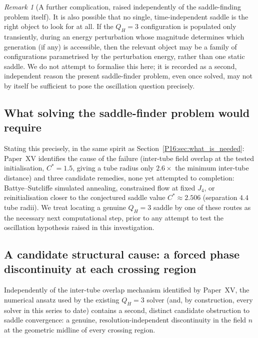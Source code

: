 \documentclass[11pt,a4paper]{article}
\theoremstyle{definition}\newtheorem{definition}[theorem]{Definition}
\theoremstyle{remark}
\newtheorem{remark}[theorem]{Remark}
\theoremstyle{definition}\newtheorem{construction}[theorem]{Construction}
\newcommand{\QH}{Q_H}
\begin{document}
\begin{remark}[A further complication, raised independently of the
  saddle-finding problem itself]
\label{P16:rem:transient_complication}
It is also possible that no single, time-independent saddle is the
right object to look for at all. If the $\QH=3$ configuration is
populated only transiently, during an energy perturbation whose
magnitude determines which generation (if any) is accessible, then
the relevant object may be a family of configurations parametrised by
the perturbation energy, rather than one static saddle. We do not
attempt to formalise this here; it is recorded as a second, independent
reason the present saddle-finder problem, even once solved, may not
by itself be sufficient to pose the oscillation question precisely.
\end{remark}

\subsection{What solving the saddle-finder problem would require}

Stating this precisely, in the same spirit as
Section~\ref{P16:sec:what_is_needed}: Paper~XV identifies the cause of the
failure (inter-tube field overlap at the tested initialisation,
$C^*=1.5$, giving a tube radius only $2.6\times$ the minimum
inter-tube distance) and three candidate remedies, none yet attempted
to completion: Battye--Sutcliffe simulated annealing, constrained
flow at fixed $J_4$, or reinitialisation closer to the conjectured
saddle value $C^*\approx2.506$ (separation $4.4$ tube radii). We treat
locating a genuine $\QH=3$ saddle by one of these routes as the
necessary next computational step, prior to any attempt to test the
oscillation hypothesis raised in this investigation.

\subsection{A candidate structural cause: a forced phase discontinuity
  at each crossing region}
\label{P16:sec:phase_discontinuity}

Independently of the inter-tube overlap mechanism identified by
Paper~XV, the numerical ansatz used by the existing $\QH=3$ solver
(and, by construction, every solver in this series to date) contains
a second, distinct candidate obstruction to saddle convergence: a
genuine, resolution-independent discontinuity in the field $n$ at the
geometric midline of every crossing region.
\end{document}
